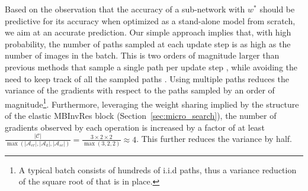 \documentclass[dvipsnames,table,xcdraw]{article}
\begin{document}
Based on the observation that the accuracy of a sub-network with $w^*$ should be predictive for its accuracy when optimized as a stand-alone model from scratch, we aim at an accurate prediction.
Our simple approach implies that, with high probability, the number of paths sampled at each update step is as high as the number of images in the batch. This is two orders of magnitude larger than previous methods that sample a single path per update step \cite{SPOS, OFA}, while avoiding the need to keep track of all the sampled paths \cite{fairnas}. Using multiple paths reduces the variance of the gradients with respect to the paths sampled by an order of magnitude\footnote{A typical batch consists of hundreds of i.i.d paths, thus a variance reduction of the square root of that is in place.}. Furthermore, leveraging the weight sharing implied by the structure of the elastic MBInvRes block (Section~\ref{sec:micro_search}), the number of gradients observed by each operation is increased by a factor of at least $\frac{|\mathcal{C}|}{\max(|\mathcal{A}_{er}|,|\mathcal{A}_{k}|,|\mathcal{A}_{se}|)}=\frac{3\times2\times2}{\max(3,2,2)}\approx 4$. This further reduces the variance by half. 
\end{document}
